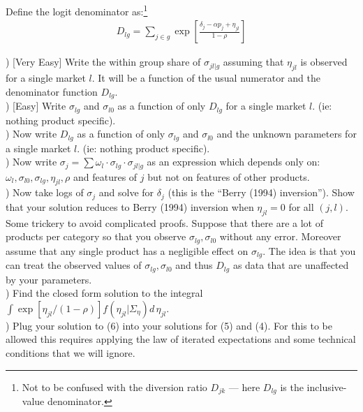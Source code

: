 \documentclass[12pt]{article}
\begin{document}
Define the logit denominator as:\footnote{Not to be confused with the diversion ratio $D_{jk}$ --- here $D_{lg}$ is the inclusive-value denominator.}
\begin{eqnarray*}
D_{lg} = \sum_{j \in g} \exp \left[\frac{\delta_j  -\alpha p_j+ \eta_{jl}}{1-\rho}\right]
\end{eqnarray*}

) [Very Easy] Write the within group share of $\sigma_{jl | g}$ assuming that $\eta_{jl}$ is observed for a single market $l$. It will be a function of the usual numerator and the denominator function $D_{lg}$.\\

) [Easy]  Write $\sigma_{lg}$ and $\sigma_{l0}$ as a function of only $D_{lg}$ for a single market $l$.  (ie: nothing product specific).\\

) Now write $D_{lg}$ as a function of only $\sigma_{lg}$ and $\sigma_{l0}$ and the unknown parameters for a single market $l$. (ie: nothing product specific).\\

) Now write $\sigma_j = \sum \omega_l \cdot \sigma_{lg} \cdot \sigma_{jl|g}$ as an expression which depends only on: $\omega_l, \sigma_{l0},\sigma_{lg},\eta_{jl},\rho$ and features of $j$ but not on features of other products.\\

) Now take logs of $\sigma_j$ and solve for $\delta_j$ (this is the ``Berry (1994) inversion''). Show that your solution reduces to Berry (1994) inversion when $\eta_{jl} = 0$ for all $(j,l)$.\\

\noindent Some trickery to avoid complicated proofs. Suppose that there are a lot of products per category so that you observe $\sigma_{lg}, \sigma_{l0}$ without any error. Moreover assume that any single product has a negligible effect on $\sigma_{lg}$. The idea is that you can treat the observed values of $\sigma_{lg}, \sigma_{l0}$ and thus $D_{lg}$ as data that are unaffected by your parameters.\\

) Find the closed form solution to the integral $\int \exp[\eta_{jl}/(1-\rho)] f(\eta_{jl} | \Sigma_{\eta}) d\, \eta_{jl}$.\\

) Plug your solution to (6) into your solutions for (5) and (4). For this to be allowed this requires applying the law of iterated expectations and some technical conditions that we will ignore. \\
\end{document}
